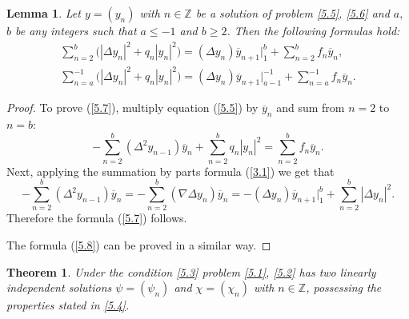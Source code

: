 \documentclass[11pt]{article}
\newtheorem{theorem}{Theorem}
\newtheorem{lemma}{Lemma}
\numberwithin{equation}{section}
\begin{document}
\begin{lemma}
\label{Lem5.1}Let $y=(y_{n})$ with $n\in
\mathbb{Z}
$ be a solution of problem \eqref{5.5}, \eqref{5.6} and $a,$ $b$ be any
integers such that $a\leq -1$ and $b\geq 2$. Then the following formulas
hold:
\begin{gather}
\sum_{n=2}^{b}\big( \left\vert \Delta y_{n}\right\vert ^{2}+q_{n}\left\vert
y_{n}\right\vert ^{2}\big) =(\Delta y_{n})\overline{y}_{n+1}\big|
_{1}^{b}+\sum_{n=2}^{b}f_{n}\overline{y}_{n},  \label{5.7}
\\
\sum_{n=a}^{-1}\big( \left\vert \Delta y_{n}\right\vert
^{2}+q_{n}\left\vert y_{n}\right\vert ^{2}\big) =(\Delta y_{n})\overline{y}%
_{n+1}\big|_{a-1}^{-1}+\sum_{n=a}^{-1}f_{n}\overline{y}_{n}.  \label{5.8}
\end{gather}
\end{lemma}

\begin{proof}
To prove (\ref{5.7}), multiply equation (\ref{5.5}) by $\overline{y}_{n}$
and sum from $n=2$ to $n=b$:
\[
-\sum_{n=2}^{b}(\Delta ^{2}y_{n-1})\overline{y}_{n}+\sum_{n=2}^{b}q_{n}\left%
\vert y_{n}\right\vert ^{2}=\sum_{n=2}^{b}f_{n}\overline{y}_{n}.
\]%
Next, applying the summation by parts formula (\ref{3.1}) we get that%
\[
-\sum_{n=2}^{b}(\Delta ^{2}y_{n-1})\overline{y}_{n}=-\sum_{n=2}^{b}(\nabla
\Delta y_{n})\overline{y}_{n}=-(\Delta y_{n})\overline{y}_{n+1}\big|
_{1}^{b}+\sum_{n=2}^{b}\left\vert \Delta y_{n}\right\vert ^{2}.
\]%
Therefore the formula (\ref{5.7}) follows.

The formula (\ref{5.8}) can be proved in a similar way.
\end{proof}

\begin{theorem}
\label{Th5.2}Under the condition \eqref{5.3} problem \eqref{5.1}, \eqref{5.2} has two linearly independent solutions $\psi =(\psi _{n})$ and $\chi =(\chi
_{n})$ with $n\in
\mathbb{Z}
$, possessing the properties stated in \eqref{5.4}.
\end{theorem}
\end{document}
